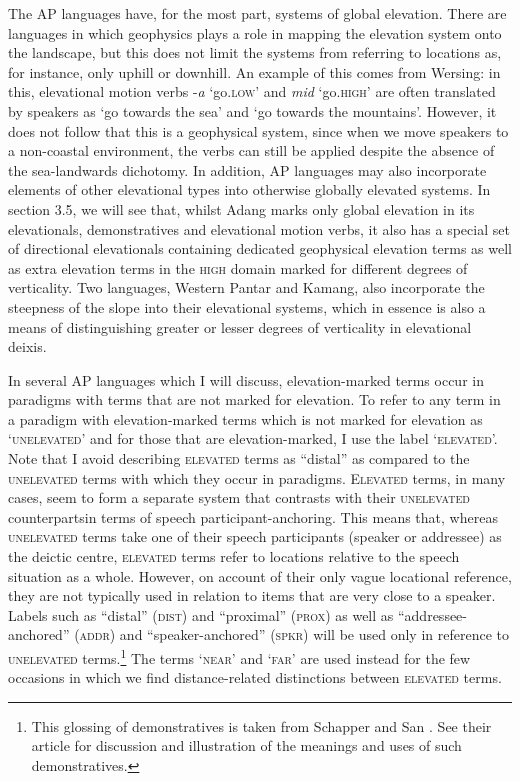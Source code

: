 The AP languages have, for the most part, systems of global elevation. There are languages in which geophysics plays a role in mapping the elevation system onto the landscape, but this does not limit the systems from referring to locations as, for instance, only uphill or downhill. An example of this comes from Wersing: in this, elevational motion verbs -\textit{a} `go.\textsc{low'} and \textit{mid} `go.\textsc{high'} are often translated by speakers as `go towards the sea' and `go towards the mountains'. However, it does not follow that this is a geophysical system, since when we move speakers to a non-coastal environment, the verbs can still be applied despite the absence of the sea-landwards dichotomy. In addition, AP languages may also incorporate elements of {other elevational types into otherwise globally elevated systems. In section 3.5, we will see that, whilst Adang marks only global elevation in its elevationals, demonstratives and elevational motion verbs, it also has a special set of directional elevationals containing dedicated geophysical elevation terms as well as extra elevation terms in the} \textsc{high} {domain marked for different degrees of verticality. Two languages, Western Pantar and Kamang, also incorporate the steepness of the slope into their elevational systems, which in essence is also a means of distinguishing greater or lesser degrees of verticality in elevational deixis.}

In several AP languages which I will discuss, elevation-marked terms occur in paradigms with terms that are not marked for elevation. To refer to any term in a paradigm with elevation-marked terms which is not marked for elevation as `\textsc{unelevated}' and for those that are elevation-marked, I use the label `\textsc{elevated'.} Note that I avoid describing \textsc{elevated} terms as ``distal'' as compared to the \textsc{unelevated} terms with which they occur in paradigms. E\textsc{levated} terms, in many cases, seem to form a separate system that contrasts with their \textsc{unelevated} counterpartsin terms of speech participant-anchoring. This means that, whereas \textsc{unelevated} terms take one of their speech participants (speaker or addressee) as the deictic centre, \textsc{elevated} terms refer to locations relative to the speech situation as a whole. However, on account of their only vague locational reference, they are not typically used in relation to items that are very close to a speaker. Labels such as ``distal'' (\textsc{dist}) and ``proximal'' (\textsc{prox}) as well as ``addressee-anchored'' (\textsc{addr)} and ``speaker-anchored'' (\textsc{spkr)} will be used only in reference to \textsc{unelevated} terms.\footnote{{}  This glossing of demonstratives is taken from Schapper and San \citet{Roque2011}. See their article for discussion and illustration of the meanings and uses of such demonstratives.} The terms `\textsc{near}' and `\textsc{far'} are used instead for the few occasions in which we find distance-related distinctions between \textsc{elevated} terms.

